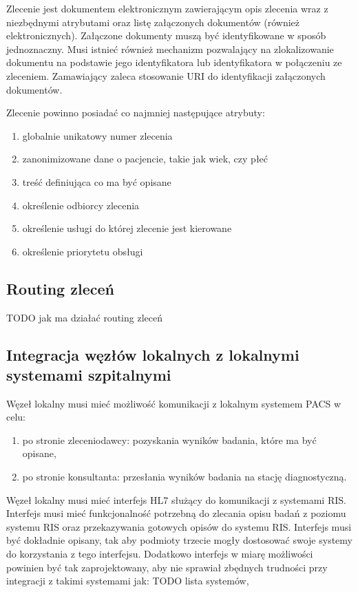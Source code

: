 \documentclass[a4paper]{article}
\begin{document}
Zlecenie jest dokumentem elektronicznym zawierającym opis zlecenia wraz z niezbędnymi atrybutami oraz listę załączonych dokumentów (również elektronicznych). Załączone dokumenty muszą być identyfikowane w sposób jednoznaczny. Musi istnieć również mechanizm pozwalający na zlokalizowanie dokumentu na podstawie jego identyfikatora lub identyfikatora w połączeniu ze zleceniem. Zamawiający zaleca stosowanie URI do identyfikacji załączonych dokumentów.

Zlecenie powinno posiadać co najmniej następujące atrybuty:
\begin{enumerate}
\item globalnie unikatowy numer zlecenia
\item zanonimizowane dane o pacjencie, takie jak wiek, czy płeć
\item treść definiująca co ma być opisane
\item określenie odbiorcy zlecenia
\item określenie usługi do której zlecenie jest kierowane
\item określenie priorytetu obsługi
\end{enumerate}

\subsection{Routing zleceń}

TODO jak ma działać routing zleceń

\subsection{Integracja węzłów lokalnych z lokalnymi systemami szpitalnymi}

Węzeł lokalny musi mieć możliwość komunikacji z lokalnym systemem PACS w celu:
\begin{enumerate}
 \item po stronie zleceniodawcy: pozyskania wyników badania, które ma być opisane,
 \item po stronie konsultanta: przesłania wyników badania na stację diagnostyczną.
\end{enumerate}

Węzeł lokalny musi mieć interfejs HL7 służący do komunikacji z systemami RIS. Interfejs musi mieć funkcjonalność potrzebną do zlecania opisu badań z poziomu systemu RIS oraz przekazywania gotowych opisów do systemu RIS. Interfejs musi być dokładnie opisany, tak aby podmioty trzecie mogły dostosować swoje systemy do korzystania z tego interfejsu. Dodatkowo interfejs w miarę możliwości powinien być tak zaprojektowany, aby nie sprawiał zbędnych trudności przy integracji z takimi systemami jak: TODO lista systemów, 
\end{document}
